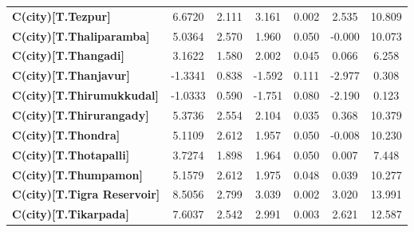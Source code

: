 \begin{center}
\begin{tabular}{lcccccc}
\textbf{C(city)[T.Tezpur]}                                                                          &       6.6720  &        2.111     &     3.161  &         0.002        &        2.535    &       10.809     \\
\textbf{C(city)[T.Thaliparamba]}                                                                    &       5.0364  &        2.570     &     1.960  &         0.050        &       -0.000    &       10.073     \\
\textbf{C(city)[T.Thangadi]}                                                                        &       3.1622  &        1.580     &     2.002  &         0.045        &        0.066    &        6.258     \\
\textbf{C(city)[T.Thanjavur]}                                                                       &      -1.3341  &        0.838     &    -1.592  &         0.111        &       -2.977    &        0.308     \\
\textbf{C(city)[T.Thirumukkudal]}                                                                   &      -1.0333  &        0.590     &    -1.751  &         0.080        &       -2.190    &        0.123     \\
\textbf{C(city)[T.Thirurangady]}                                                                    &       5.3736  &        2.554     &     2.104  &         0.035        &        0.368    &       10.379     \\
\textbf{C(city)[T.Thondra]}                                                                         &       5.1109  &        2.612     &     1.957  &         0.050        &       -0.008    &       10.230     \\
\textbf{C(city)[T.Thotapalli]}                                                                      &       3.7274  &        1.898     &     1.964  &         0.050        &        0.007    &        7.448     \\
\textbf{C(city)[T.Thumpamon]}                                                                       &       5.1579  &        2.612     &     1.975  &         0.048        &        0.039    &       10.277     \\
\textbf{C(city)[T.Tigra Reservoir]}                                                                 &       8.5056  &        2.799     &     3.039  &         0.002        &        3.020    &       13.991     \\
\textbf{C(city)[T.Tikarpada]}                                                                       &       7.6037  &        2.542     &     2.991  &         0.003        &        2.621    &       12.587     \\

\end{tabular}
\end{center}

